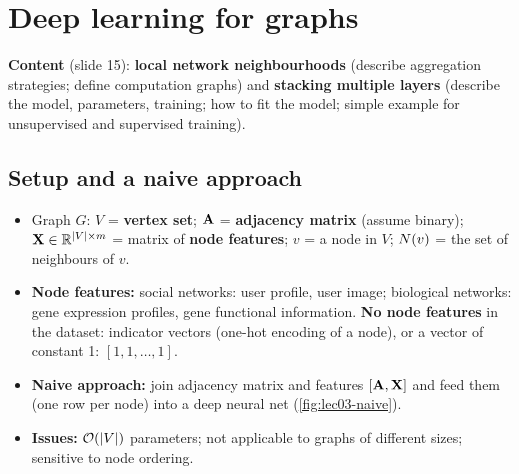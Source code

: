 \section{Deep learning for graphs}\label{sec:lec03-dlg}

\textbf{Content} (slide 15): \textbf{local network neighbourhoods} (describe
aggregation strategies; define computation graphs) and \textbf{stacking
multiple layers} (describe the model, parameters, training; how to fit the
model; simple example for unsupervised and supervised training).

\subsection{Setup and a naive approach}\label{sec:lec03-setup}

\begin{itemize}
  \item Graph $G$: $V$ = \textbf{vertex set}; $\mathbf{A}$ = \textbf{adjacency
    matrix} (assume binary); $\mathbf{X}\in\mathbb{R}^{|V|\times m}$ = matrix of
    \textbf{node features}; $v$ = a node in $V$; $N(v)$ = the set of
    neighbours of $v$.
  \item \textbf{Node features:} social networks: user profile, user image;
    biological networks: gene expression profiles, gene functional information.
    \textbf{No node features} in the dataset: indicator vectors (one-hot
    encoding of a node), or a vector of constant 1: $[1,1,\dots,1]$.
  \item \textbf{Naive approach:} join adjacency matrix and features $[\mathbf{A},\mathbf{X}]$
    and feed them (one row per node) into a deep neural net
    (\cref{fig:lec03-naive}).
  \item \textbf{Issues:} $\mathcal{O}(|V|)$ parameters; not applicable to graphs of
    different sizes; sensitive to node ordering.
\end{itemize}

